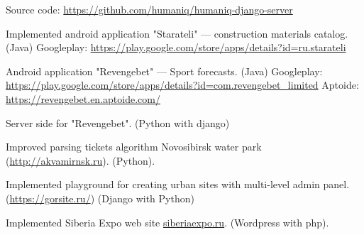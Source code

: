 \begin{cventries}
{\begin{cvitems}
{\begin{flushleft}
            Source code: \url{https://github.com/humaniq/humaniq-django-server}\linebreak
        \end{flushleft}
    }
    \item {
        \begin{flushleft}
            Implemented android application "Starateli" --- construction materials catalog. (Java)\linebreak
            Googleplay: \url{https://play.google.com/store/apps/details?id=ru.starateli}\linebreak
        \end{flushleft}
    }
\end{cvitems}
}

\cventry
{} %
{} %
{} %
{} %
{
\begin{cvitems}
    \item {
        \begin{flushleft}
            Android application "Revengebet" --- Sport forecasts. (Java)\linebreak
            Googleplay: \url{https://play.google.com/store/apps/details?id=com.revengebet_limited}\linebreak
            Aptoide: \url{https://revengebet.en.aptoide.com/}\linebreak
        \end{flushleft}
    }
    \item {
        \begin{flushleft}
            Server side for "Revengebet". (Python with django)\linebreak
        \end{flushleft}
    }
    \item {
        \begin{flushleft}
            Improved parsing tickets algorithm Novosibirsk water park (\url{http://akvamirnsk.ru}). (Python).\linebreak
        \end{flushleft}
    }
    \item {
        \begin{flushleft}
            Implemented playground for creating urban sites with multi-level admin panel. (\url{https://gorsite.ru/}) (Django with Python)\linebreak
        \end{flushleft}
    }
    \item {
        \begin{flushleft}
            Implemented Siberia Expo web site \url{siberiaexpo.ru}. (Wordpress with php).\linebreak
        \end{flushleft}
    }
\end{cvitems}
}


\end{cventries}
